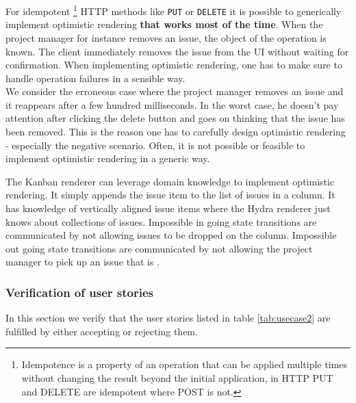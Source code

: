 For idempotent \footnote{Idempotence is a property of an operation that can be applied multiple times without changing the result beyond the initial application, in HTTP PUT and DELETE are idempotent where POST is not.} HTTP methods like \lstinline{PUT} or \lstinline{DELETE} it is possible to generically implement optimistic rendering \textbf{that works most of the time}. When the project manager for instance removes an issue, the object of the operation is known. The client immediately removes the issue from the UI without waiting for confirmation. When implementing optimistic rendering, one has to make sure to handle operation failures in a sensible way. \\
We consider the erroneous case where the project manager removes an issue and it reappears after a few hundred milliseconds. In the worst case, he doesn't pay attention after clicking the delete button and goes on thinking that the issue has been removed. This is the reason one has to carefully design optimistic rendering - especially the negative scenario. Often, it is not possible or feasible to implement optimistic rendering in a generic way.

The Kanban renderer can leverage domain knowledge to implement optimistic rendering. It simply appends the issue item to the list of issues in a column. It has knowledge of vertically aligned issue items where the Hydra renderer just knows about collections of issues. Impossible in going state transitions are communicated by not allowing issues to be dropped on the  column. Impossible out going state transitions are communicated by not allowing the project manager to pick up an issue that is .

\subsubsection{Verification of user stories}
In this section we verify that the user stories listed in table \ref{tab:usecase2} are fulfilled by either accepting or rejecting them.

